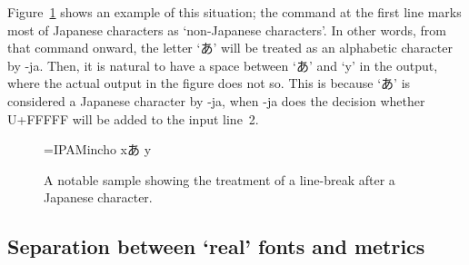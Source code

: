 \documentclass{ajt}
\begin{document}
Figure~\ref{fig-linebreak} shows an example of this situation; the
command at the first line marks most of Japanese characters as
`non-Japanese characters'. In other words, from that command onward, the
letter `あ' will be treated as an alphabetic character by
\LuaTeX-ja. Then, it is natural to have a space between `あ' and `y' in
the output, where the actual output in the figure does not so.  This is
because `あ' is considered a Japanese character by \LuaTeX-ja,
when \LuaTeX-ja does the decision whether U+FFFFF will be added to the
input line~2.

\begin{figure}
\begin{LTXexample}
\font\x=IPAMincho \x
{}xあ
y
\end{LTXexample}
\caption{A notable sample showing the treatment of a line-break after a
Japanese character.}\label{fig-linebreak}
\end{figure}

\subsection{Separation between `real' fonts and metrics}
\label{ssec-sepmet}
\end{document}
